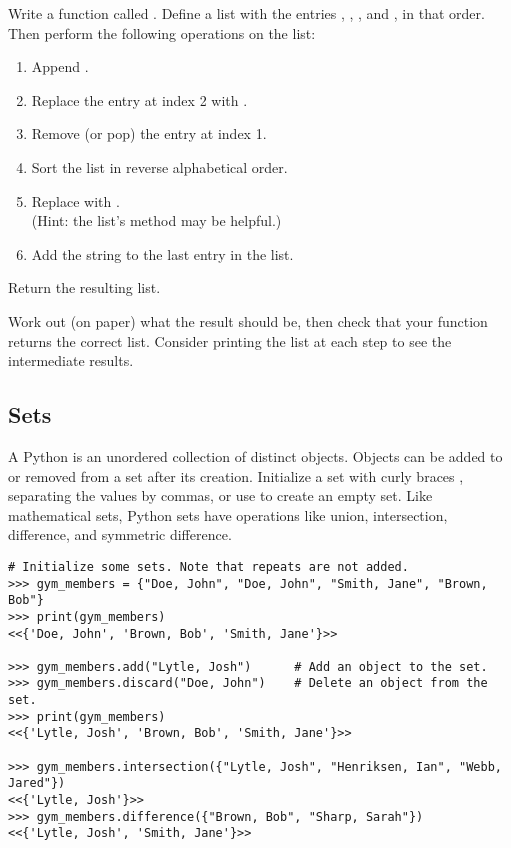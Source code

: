 \begin{problem} %
Write a function called .
Define a list with the entries , , , and , in that order.
Then perform the following operations on the list:
\begin{enumerate}
\item Append .
\item Replace the entry at index 2 with .
\item Remove (or pop) the entry at index 1.
\item Sort the list in reverse alphabetical order.
\item Replace  with .
\\(Hint: the list's  method may be helpful.)
\item Add the string  to the last entry in the list.
\end{enumerate}
Return the resulting list.

Work out (on paper) what the result should be, then check that your function returns the correct list.
Consider printing the list at each step to see the intermediate results.
\end{problem}

\subsection*{Sets} %

A Python  is an unordered collection of distinct objects.
Objects can be added to or removed from a set after its creation.
Initialize a set with curly braces \li{\{ \}}, separating the values by commas, or use  to create an empty set.
Like mathematical sets, Python sets have operations like union, intersection,
difference, and symmetric difference.

\begin{lstlisting}
# Initialize some sets. Note that repeats are not added.
>>> gym_members = {"Doe, John", "Doe, John", "Smith, Jane", "Brown, Bob"}
>>> print(gym_members)
<<{'Doe, John', 'Brown, Bob', 'Smith, Jane'}>>

>>> gym_members.add("Lytle, Josh")      # Add an object to the set.
>>> gym_members.discard("Doe, John")    # Delete an object from the set.
>>> print(gym_members)
<<{'Lytle, Josh', 'Brown, Bob', 'Smith, Jane'}>>

>>> gym_members.intersection({"Lytle, Josh", "Henriksen, Ian", "Webb, Jared"})
<<{'Lytle, Josh'}>>
>>> gym_members.difference({"Brown, Bob", "Sharp, Sarah"})
<<{'Lytle, Josh', 'Smith, Jane'}>>
\end{lstlisting}

